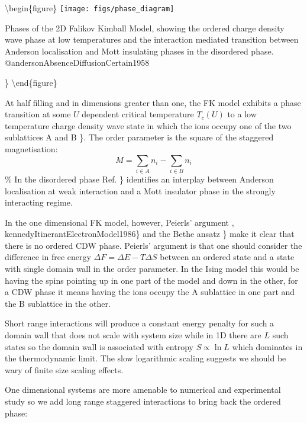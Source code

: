 \textbackslash begin\{figure\} \centering \texttt{[image: figs/phase\_diagram]}

\caption{Phases of the 2D Falikov Kimball Model, showing the ordered charge density wave phase at low temperatures and the interaction mediated transition between Anderson localisation and Mott insulating phases in the disordered phase. @andersonAbsenceDiffusionCertain1958}

\} \label{fig:FK_phase_diagram} \textbackslash end\{figure\}

At half filling and in dimensions greater than one, the FK model exhibits a phase transition at some \(U\) dependent critical temperature \(T_c(U)\) to a low temperature charge density wave state in which the ions occupy one of the two sublattices A and B \textcite{maskaThermodynamicsTwodimensionalFalicovKimball2006}\}. The order parameter is the square of the staggered magnetisation: \[
M = \sum_{i \in A} n_i - \sum_{i \in B} n_i
\] \% In the disordered phase Ref. \textcite{andersonAbsenceDiffusionCertain1958}\} identifies an interplay between Anderson localisation at weak interaction and a Mott insulator phase in the strongly interacting regime.

In the one dimensional FK model, however, Peierls' argument \textcite{peierlsIsingModelFerromagnetism1936}, kennedyItinerantElectronModel1986\} and the Bethe ansatz \textcite{liebAbsenceMottTransition1968}\} make it clear that there is no ordered CDW phase. Peierls' argument is that one should consider the difference in free energy \(\Delta F = \Delta E - T\Delta S\) between an ordered state and a state with single domain wall in the order parameter. In the Ising model this would be having the spins pointing up in one part of the model and down in the other, for a CDW phase it means having the ions occupy the A sublattice in one part and the B sublattice in the other.

Short range interactions will produce a constant energy penalty for such a domain wall that does not scale with system size while in 1D there are \(L\) such states so the domain wall is associated with entropy \(S \propto \ln L\) which dominates in the thermodynamic limit. The slow logarithmic scaling suggests we should be wary of finite size scaling effects.

One dimensional systems are more amenable to numerical and experimental study so we add long range staggered interactions to bring back the ordered phase:

